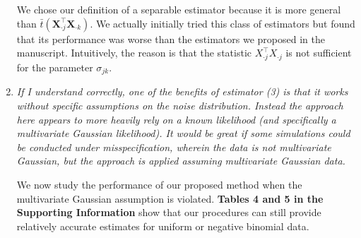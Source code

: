 \documentclass[12pt]{article}
\def\bs{\boldsymbol}
\begin{document}
\begin{enumerate}
We chose our definition of a separable estimator because it is more general than $\bar{t}(\bs{X}_{\cdot j}^\top \bs{X}_{\cdot k})$. We actually initially tried this class of estimators but found that its performance was worse than the estimators we proposed in the manuscript. Intuitively, the reason is that the statistic $X_{\cdot j}^\top X_{\cdot j}$ is not sufficient for the parameter $\sigma_{jk}$.

\item \emph{If I understand correctly, one of the benefits of estimator (3) is that it works without specific assumptions on the noise distribution. Instead the approach here appears to more heavily rely on a known likelihood (and specifically a multivariate Gaussian likelihood). It would be great if some simulations could be conducted under misspecification, wherein the data is not multivariate Gaussian, but the approach is applied assuming multivariate Gaussian data.}

  We now study the performance of our proposed method when the multivariate Gaussian assumption is violated. \textbf{Tables 4 and 5 in the Supporting Information} show that our procedures can still provide relatively accurate estimates for uniform or negative binomial data.
  
\end{enumerate}
\end{document}

